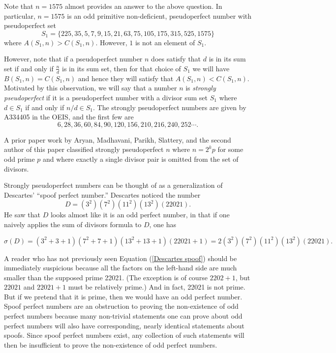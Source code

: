 \documentclass{article}
\begin{document}
 Note that $n=1575$ almost provides an answer to the above question.  In particular, $n=1575$ is an odd primitive non-deficient, pseudoperfect number with pseudoperfect set $$S_1=
 \{225, 35, 5, 7, 9, 15, 21, 63, 75, 105, 175, 315, 525,    1575 \} $$ where $A(S_1,n) >C(S_1,n)$. However, $1$ is not an element of $S_1$.

However, note that if a pseudoperfect number $n$ does satisfy that $d$ is in its sum set if and only if $\frac{n}{d}$ is in its sum set, then  for that choice of $S_1$ we will have $B(S_1,n)= C(S_1,n)$ and hence they will  satisfy that $A(S_1,n) < C(S_1,n)$. Motivated by this observation, we will say that a number $n$ is \emph{strongly pseudoperfect} if it is a pseudoperfect number with a divisor sum set $S_1$ where $d \in S_1$ if and only if $n/d \in S_1$.  The strongly pseudoperfect numbers are given by A334405 in the OEIS\cite{OEIS A334405}, and the first few are 
$$6, 28, 36, 60, 84, 90, 120, 156, 210, 216, 240, 252 \cdots .$$

A prior paper \cite{AMPSZ} work by Aryan, Madhavani, Parikh,  Slattery, and the second author of this paper classified strongly pseudoperfect $n$ where $n=2^kp$ for some odd prime $p$ and where exactly a single divisor pair is omitted from the set of divisors. 

Strongly pseudoperfect numbers can be thought of as a generalization of Descartes' ``spoof perfect number.'' Descartes noticed the number $$D=(3^2)(7^2)(11^2)(13^2)(22021).$$  He saw that $D$ looks almost like it is an odd perfect number, in that if one naively applies the sum of divisors formula to $D$, one has 

\begin{equation}\sigma(D)=(3^2+3+1)(7^2+7+1)(13^2+13+1)(22021+1) = 2(3^2)(7^2)(11^2)(13^2)(22021).\label{Descartes spoof} \end{equation}

A reader who has not previously seen Equation (\ref{Descartes spoof}) should be immediately suspicious because all the factors on the left-hand side are much smaller than the supposed prime 22021. (The exception is of course $2202+1$, but $22021$ and $22021+1$ must be relatively prime.) And in fact, 22021 is not prime. But if we pretend that it is prime, then we would have an odd perfect number.  Spoof perfect numbers are an obstruction to proving the non-existence of odd perfect numbers because many non-trivial statements one can prove about odd perfect numbers will also have corresponding, nearly identical statements about spoofs. Since spoof perfect numbers exist, any collection of such statements will then be insufficient to prove the non-existence of odd perfect numbers.
\end{document}
